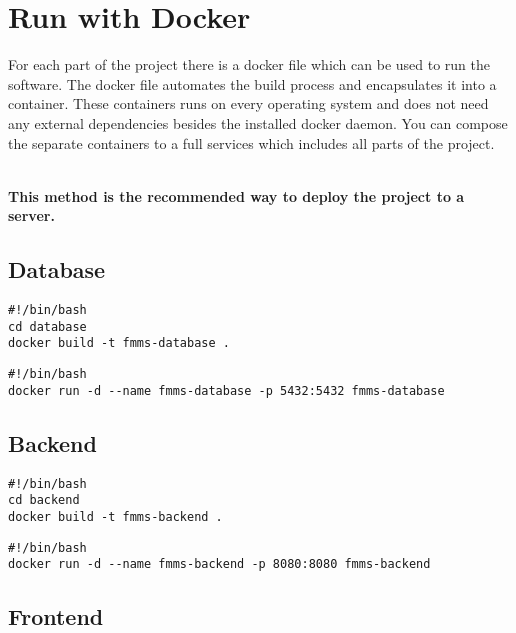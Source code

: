 
\chapter{Run with Docker}

For each part of the project there is a docker file which can be used to run the software.
The docker file automates the build process and encapsulates it into a container.
These containers runs on every operating system and does not need any external dependencies besides the installed docker daemon.
You can compose the separate containers to a full services which includes all parts of the project.

~\\
\textbf{This method is the recommended way to deploy the project to a server.}

\section{Database}
\label{docker:db}

\begin{lstlisting}[caption={Build Database Container}]
#!/bin/bash
cd database
docker build -t fmms-database .
\end{lstlisting}

\begin{lstlisting}[caption={Run Database Container}]
#!/bin/bash
docker run -d --name fmms-database -p 5432:5432 fmms-database
\end{lstlisting}


\section{Backend}
\label{docker:backend}

\begin{lstlisting}[caption={Build Backend Container}]
#!/bin/bash
cd backend
docker build -t fmms-backend .
\end{lstlisting}

\begin{lstlisting}[caption={Run Backend Container}]
#!/bin/bash
docker run -d --name fmms-backend -p 8080:8080 fmms-backend
\end{lstlisting}

\section{Frontend}
\label{docker:frontend}

